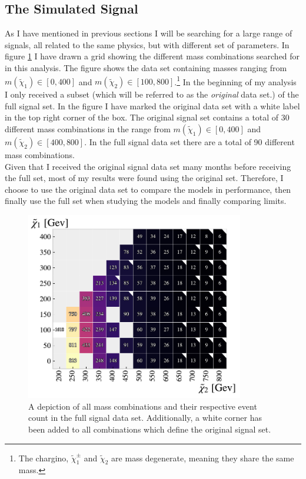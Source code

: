\subsection{The Simulated Signal}\label{subsec:signal}
As I have mentioned in previous sections I will be searching for a large range of signals, all related to the same
physics, but with different set of parameters. In figure \ref{fig:nrSignal} I have drawn a grid showing the different mass combinations 
searched for in this analysis. The figure shows the data set containing masses ranging from $m({\tilde{\chi}_1})\in[0,400]$
and $m({\tilde{\chi}_2})\in[100,800]$.\footnote{The chargino, $\tilde{\chi}^{\pm}_1$ and $\tilde{\chi}_2$ are mass degenerate, 
meaning they share the same mass.} In the beginning of my analysis I only received a subset (which will be referred to as the 
\emph{original} data set.) of the full signal set. In the figure I have marked the original data set with a white label in the top 
right corner of the box. The original signal set contains a total of 30 different mass combinations in the range from 
$m({\tilde{\chi}_1})\in[0,400]$ and $m({\tilde{\chi}_2})\in[400,800]$. In the full signal data set there are a total of 90 different 
mass combinations.
\\
Given that I received the original signal data set many months before receiving the full set, most of my results were found using the 
original set. Therefore, I choose to use the original data set to compare the models in performance, then finally use the full set 
when studying the models and finally comparing limits.
\begin{figure}
  \centering
  \includegraphics[width=0.85\textwidth]{Figures/MLResults/NN/SUSY/Grid/NrSignalEvents.pdf}
  \caption{A depiction of all mass combinations and their respective event count in the full signal data set.
  Additionally, a white corner has been added to all combinations which define the original signal set.}
  \label{fig:nrSignal}
\end{figure}

